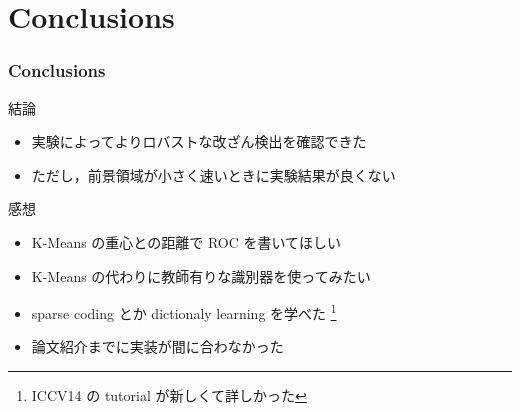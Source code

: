 \section{Conclusions}


\begin{frame}\frametitle{Conclusions}
\begin{block}{結論}
\begin{itemize}
    \item 実験によってよりロバストな改ざん検出を確認できた
    \item ただし，前景領域が小さく速いときに実験結果が良くない
\end{itemize} 
\end{block}

\begin{block}{感想}
\begin{itemize}
  \item K-Means の重心との距離で ROC を書いてほしい
  \item K-Means の代わりに教師有りな識別器を使ってみたい
  \item sparse coding とか dictionaly learning を学べた \footnote{ICCV14 の tutorial\cite{Mairal2014} が新しくて詳しかった}
  \item 論文紹介までに実装が間に合わなかった
\end{itemize}
\end{block}
\end{frame}